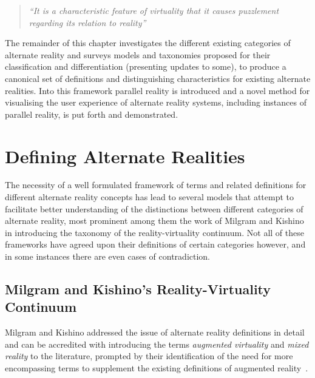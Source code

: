 \begin{quote}
	\textit{``It is a characteristic feature of virtuality that it causes puzzlement regarding its relation to reality''}~\cite{Brey2014}
\end{quote}

The remainder of this chapter investigates the different existing categories of alternate reality and surveys models and taxonomies proposed for their classification and differentiation (presenting updates to some), to produce a canonical set of definitions and distinguishing characteristics for existing alternate realities. Into this framework parallel reality is introduced and a novel method for visualising the user experience of alternate reality systems, including instances of parallel reality, is put forth and demonstrated.


\section{Defining Alternate Realities}

The necessity of a well formulated framework of terms and related definitions for different alternate reality concepts has lead to several models that attempt to facilitate better understanding of the distinctions between different categories of alternate reality, most prominent among them the work of Milgram and Kishino in introducing the taxonomy of the reality-virtuality continuum. Not all of these frameworks have agreed upon their definitions of certain categories however, and in some instances there are even cases of contradiction.


\subsection{Milgram and Kishino's Reality-Virtuality Continuum}
\label{milgram&kishino}
Milgram and Kishino addressed the issue of alternate reality definitions in detail and can be accredited with introducing the terms \textit{augmented virtuality} and \textit{mixed reality} to the literature, prompted by their identification of the need for more encompassing terms to supplement the existing definitions of augmented reality~\cite{Milgram1999}.

